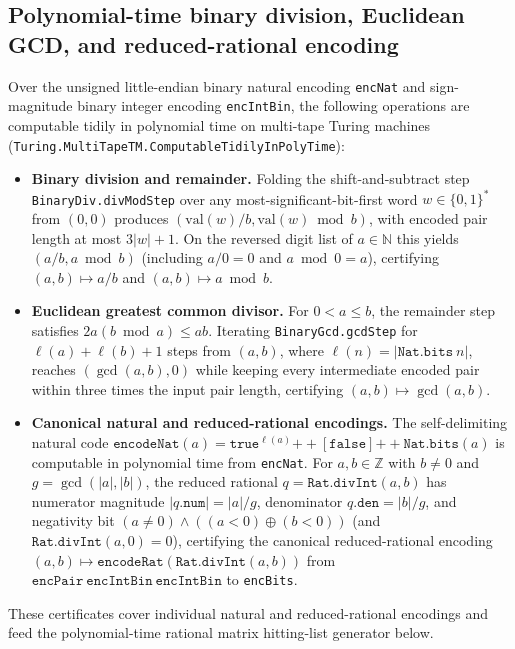 \begin{result}
\subsection{Polynomial-time binary division, Euclidean GCD, and reduced-rational encoding}
Over the unsigned little-endian binary natural encoding \texttt{encNat} and sign-magnitude
binary integer encoding \texttt{encIntBin}, the following operations are computable tidily in
polynomial time on multi-tape Turing machines
(\texttt{Turing.MultiTapeTM.ComputableTidilyInPolyTime}):
\begin{itemize}
\item \textbf{Binary division and remainder.} Folding the shift-and-subtract step
\texttt{BinaryDiv.divModStep} over any most-significant-bit-first word $w\in\{0,1\}^*$ from
$(0,0)$ produces $(\mathrm{val}(w)/b,\mathrm{val}(w)\bmod b)$, with encoded pair length at most
$3|w|+1$. On the reversed digit list of $a\in\mathbb N$ this yields $(a/b,a\bmod b)$ (including
$a/0=0$ and $a\bmod 0=a$), certifying $(a,b)\mapsto a/b$ and $(a,b)\mapsto a\bmod b$.
\item \textbf{Euclidean greatest common divisor.} For $0<a\le b$, the remainder step satisfies
$2a(b\bmod a)\le ab$. Iterating \texttt{BinaryGcd.gcdStep} for
$\ell(a)+\ell(b)+1$ steps from $(a,b)$, where $\ell(n)=|\texttt{Nat.bits}\ n|$, reaches
$(\gcd(a,b),0)$ while keeping every intermediate encoded pair within three times the input pair
length, certifying $(a,b)\mapsto\gcd(a,b)$.
\item \textbf{Canonical natural and reduced-rational encodings.} The self-delimiting natural code
$\texttt{encodeNat}(a)=\texttt{true}^{\ell(a)}\mathbin{+\!+}[\texttt{false}]\mathbin{+\!+}\texttt{Nat.bits}(a)$
is computable in polynomial time from \texttt{encNat}. For $a,b\in\mathbb Z$ with $b\ne 0$ and
$g=\gcd(|a|,|b|)$, the reduced rational $q=\texttt{Rat.divInt}(a,b)$ has numerator magnitude
$|q.\texttt{num}|=|a|/g$, denominator $q.\texttt{den}=|b|/g$, and negativity bit
$(a\ne 0)\wedge((a<0)\oplus(b<0))$ (and $\texttt{Rat.divInt}(a,0)=0$), certifying the canonical
reduced-rational encoding $(a,b)\mapsto\texttt{encodeRat}(\texttt{Rat.divInt}(a,b))$ from
$\texttt{encPair}\ \texttt{encIntBin}\ \texttt{encIntBin}$ to \texttt{encBits}.
\end{itemize}
These certificates cover individual natural and reduced-rational encodings and feed the
polynomial-time rational matrix hitting-list generator below.
\citep{AroraBarak09,OpenAI2026RationalHitting,Schlesinger2026RationalHitting}

\end{result}
